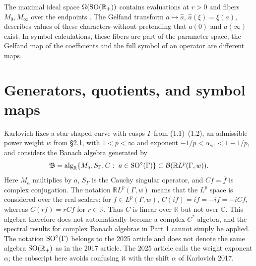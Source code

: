The maximal ideal space $\Omega(\operatorname{SO}(\mathbb R_+))$ contains evaluations
at $r>0$ and fibers $M_0,M_\infty$ over the endpoints
\cite[§2, p.~466]{Karlovich2017}. The Gelfand transform
$a\mapsto\widehat a$, $\widehat a(\xi)=\xi(a)$, describes values of these
characters without pretending that $a(0)$ and $a(\infty)$ exist. In
symbol calculations, these fibers are part of the parameter space;
the Gelfand map of the coefficients and the full symbol of an operator
are different maps.

\section{Generators, quotients, and symbol maps}

Karlovich \cite[eq.~(1.4), p.~3]{Karlovich2025} fixes a star-shaped
curve with cusps $\Gamma$ from (1.1)--(1.2), an admissible power weight
$w$ from §2.1, with $1<p<\infty$ and exponent
$-1/p<\alpha_{\mathrm{wt}}<1-1/p$, and considers the Banach algebra
generated by
\[
 \mathfrak B=
 \operatorname{alg}_{\mathbb R}
 \{M_a,S_\Gamma,C:\ a\in\operatorname{SO}^\diamond(\Gamma)\}
 \subset\mathcal B(\mathbb RL^p(\Gamma,w)).
\]
Here $M_a$ multiplies by $a$, $S_\Gamma$ is the Cauchy singular operator,
and $Cf=\overline f$ is complex conjugation. The notation
$\mathbb RL^p(\Gamma,w)$ means that the $L^p$ space is considered over
the real scalars: for $f\in L^p(\Gamma,w)$,
$C(if)=\overline{if}=-i\overline f=-iCf$, whereas
$C(rf)=rCf$ for $r\in\mathbb R$. Thus $C$ is linear over $\mathbb R$
but not over $\mathbb C$. This algebra therefore does not automatically
become a complex $C^*$-algebra, and the spectral results for complex
Banach algebras in Part 1 cannot simply be applied. The notation $\operatorname{SO}^\diamond(\Gamma)$
belongs to the 2025 article and does not denote the same algebra
$\operatorname{SO}(\mathbb R_+)$ as in the 2017 article. The 2025 article calls the
weight exponent $\alpha$; the subscript here avoids confusing it with
the shift $\alpha$ of Karlovich 2017.

\begin{center}
\end{center}

